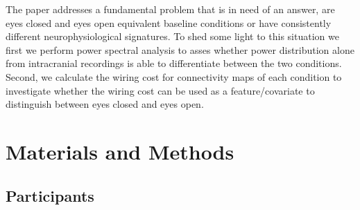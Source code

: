 \documentclass[11pt, onecolumn]{article}
\begin{document}
The paper addresses a fundamental problem that is in need of an answer, are eyes closed and eyes open equivalent baseline conditions or have consistently different neurophysiological signatures. To shed some light to this situation we first we perform power spectral analysis to asses whether power distribution alone from intracranial recordings is able to differentiate between the two conditions. Second, we calculate the wiring cost for connectivity maps of each condition to investigate whether the wiring cost can be used as a feature/covariate to distinguish between eyes closed and eyes open. 
\section{Materials and Methods}
\label{se:maandme}
\subsection{Participants}
\end{document}
